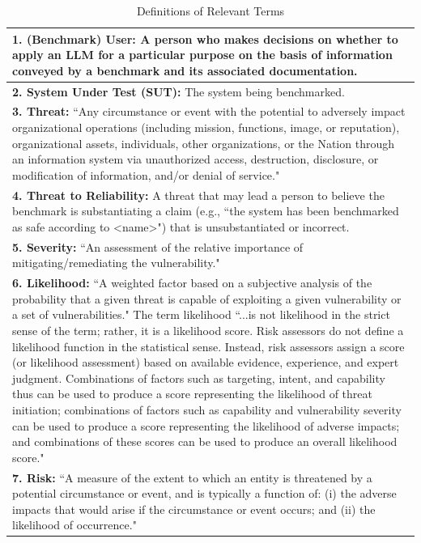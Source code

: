 \documentclass{article}
\begin{document}
\begin{table}[h!]
  \caption{Definitions of Relevant Terms}
  \label{table:defs}
  \label{tab:definitions-terms}
  \centering
  \begin{tabular}{p{12cm}}
    \toprule
    \textbf{1. (Benchmark) User:} A person who makes decisions on whether to apply an LLM for a particular purpose on the basis of information conveyed by a benchmark and its associated documentation. \\
    \midrule
    \textbf{2. System Under Test (SUT):} The system being benchmarked. \\
    \midrule
    \textbf{3. Threat:} ``Any circumstance or event with the potential to adversely impact organizational operations (including mission, functions, image, or reputation), organizational assets, individuals, other organizations, or the Nation through an information system via unauthorized access, destruction, disclosure, or modification of information, and/or denial of service." \cite{cnssi4009}\\
    \midrule
    \textbf{4. Threat to Reliability:} A threat that may lead a person to believe the benchmark is substantiating a claim (e.g., ``the system has been benchmarked as safe according to <name>") that is unsubstantiated or incorrect. \\
    \midrule
    \textbf{5. Severity:} ``An assessment of the relative importance of mitigating/remediating the vulnerability." \cite{nist80030r1} \\
    \midrule
    \textbf{6. Likelihood:} ``A weighted factor based on a subjective analysis of the probability that a given threat is capable of exploiting a given vulnerability or a set of vulnerabilities."\cite{cnssi4009} The term likelihood ``...is not likelihood in the strict sense of the term; rather, it is a likelihood score. Risk assessors do not define a likelihood function in the statistical sense. Instead, risk assessors assign a score (or likelihood assessment) based on available evidence, experience, and expert judgment. Combinations of factors such as targeting, intent, and capability thus can be used to produce a score representing the likelihood of threat initiation; combinations of factors such as capability and vulnerability severity can be used to produce a score representing the likelihood of adverse impacts; and combinations of these scores can be used to produce an overall likelihood score." \cite{nist80030r1} \\
    \midrule
    \textbf{7. Risk:} ``A measure of the extent to which an entity is threatened by a potential circumstance or event, and is typically a function of: (i) the adverse impacts that would arise if the circumstance or event occurs; and (ii) the likelihood of occurrence." \cite{nist80030r1} \\

\end{tabular}
\end{table}
\end{document}
